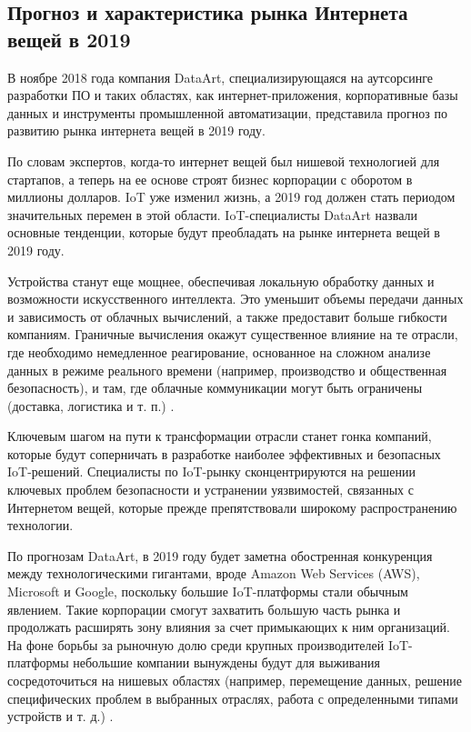 \subsection{Прогноз и характеристика рынка Интернета вещей в 2019}
\label{sec:analysis:data_art}

В ноябре 2018 года компания DataArt, специализирующаяся на аутсорсинге разработки ПО и таких областях, как интернет-приложения, корпоративные базы данных и инструменты промышленной автоматизации, представила прогноз по развитию рынка интернета вещей в 2019 году.

По словам экспертов, когда-то интернет вещей был нишевой технологией для стартапов, а теперь на ее основе строят бизнес корпорации с оборотом в миллионы долларов. IoT уже изменил жизнь, а 2019 год должен стать периодом значительных перемен в этой области. IoT-специалисты DataArt назвали основные тенденции, которые будут преобладать на рынке интернета вещей в 2019 году.

Устройства станут еще мощнее, обеспечивая локальную обработку данных и возможности искусственного интеллекта. Это уменьшит объемы передачи данных и зависимость от облачных вычислений, а также предоставит больше гибкости компаниям. Граничные вычисления окажут существенное влияние на те отрасли, где необходимо немедленное реагирование, основанное на сложном анализе данных в режиме реального времени (например, производство и общественная безопасность), и там, где облачные коммуникации могут быть ограничены (доставка, логистика и т. п.) \cite{iot_data_2019}.

Ключевым шагом на пути к трансформации отрасли станет гонка компаний, которые будут соперничать в разработке наиболее эффективных и безопасных IoT-решений. Специалисты по IoT-рынку сконцентрируются на решении ключевых проблем безопасности и устранении уязвимостей, связанных с Интернетом вещей, которые прежде препятствовали широкому распространению технологии.

По прогнозам DataArt, в 2019 году будет заметна обостренная конкуренция между технологическими гигантами, вроде Amazon Web Services (AWS), Microsoft и Google, поскольку большие IoT-платформы стали обычным явлением. Такие корпорации смогут захватить большую часть рынка и продолжать расширять зону влияния за счет примыкающих к ним организаций. На фоне борьбы за рыночную долю среди крупных производителей IoT-платформы небольшие компании вынуждены будут для выживания сосредоточиться на нишевых областях (например, перемещение данных, решение специфических проблем в выбранных отраслях, работа с определенными типами устройств и т. д.) \cite{iot_data_2019}.

